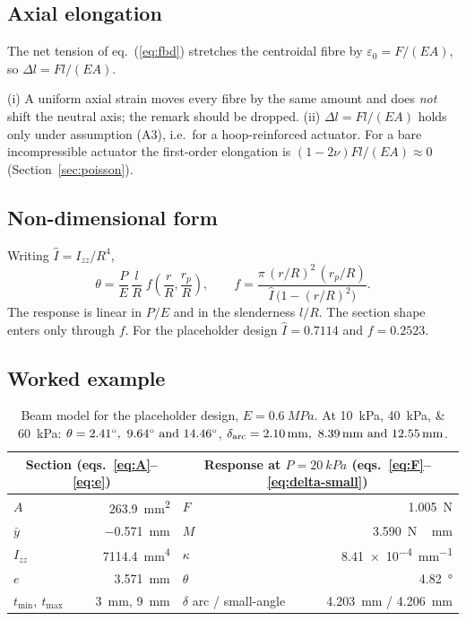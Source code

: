 \documentclass[11pt,a4paper]{article}
\numberwithin{equation}{section}
\newcommand{\Izz}{I_{zz}}
\newcommand{\rp}{r_p}
\newcommand{\tmin}{t_{\min}}
\newcommand{\tmax}{t_{\max}}
\begin{document}
\subsection{Axial elongation}
The net tension of eq.~(\ref{eq:fbd}) stretches the centroidal fibre by $\varepsilon_0 = F/(EA)$, so $\Delta l = Fl/(EA)$.

\begin{correction}
(i) A uniform axial strain moves every fibre by the same amount and does \emph{not} shift the neutral axis; the remark should be dropped.
(ii) $\Delta l = Fl/(EA)$ holds only under assumption (A3), i.e.\ for a hoop-reinforced actuator. For a bare incompressible actuator the first-order elongation is $(1-2\nu)Fl/(EA)\approx 0$ (Section~\ref{sec:poisson}).
\end{correction}

\subsection{Non-dimensional form}
Writing $\hat I = \Izz/R^4$,
\begin{equation}
\theta = \frac{P}{E}\,\frac{l}{R}\; f\!\left(\frac{r}{R},\frac{\rp}{R}\right),\qquad
f = \frac{\pi\,(r/R)^2\,(\rp/R)}{\hat I\,\big(1-(r/R)^2\big)} .
\end{equation}
The response is linear in $P/E$ and in the slenderness $l/R$. The section shape enters only through $f$.
For the placeholder design $\hat I = 0.7114$ and $f = 0.2523$.

\subsection{Worked example}
\begin{table}[H]
\centering\small
\begin{tabular}{@{}lr@{\qquad}lr@{}}
\toprule
\multicolumn{2}{c}{Section (eqs.~\ref{eq:A}--\ref{eq:e})} & \multicolumn{2}{c}{Response at $P=\SI{20}{kPa}$ (eqs.~\ref{eq:F}--\ref{eq:delta-small})}\\
\midrule
$A$ & \SI{263.9}{mm^2} & $F$ & \SI{1.005}{N}\\
$\bar y$ & \SI{-0.571}{mm} & $M$ & \SI{3.590}{N\,mm}\\
$\Izz$ & \SI{7114.4}{mm^4} & $\kappa$ & \SI{8.41e-4}{mm^{-1}}\\
$e$ & \SI{3.571}{mm} & $\theta$ & \SI{4.82}{\degree}\\
$\tmin,\ \tmax$ & \SI{3}{mm}, \SI{9}{mm} & $\delta$ arc / small-angle & \SI{4.203}{mm} / \SI{4.206}{mm}\\
\bottomrule
\end{tabular}
\caption{Beam model for the placeholder design, $E=\SI{0.6}{MPa}$. At \SIlist{10;40;60}{kPa}: $\theta = \SIlist{2.41;9.64;14.46}{\degree}$, $\delta_{\text{arc}} = \SIlist{2.10;8.39;12.55}{mm}$.}
\label{tab:example}
\end{table}
\end{document}
